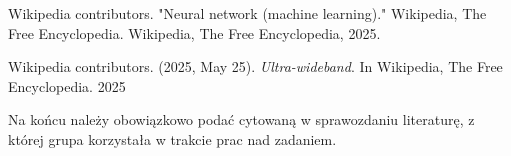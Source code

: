 \documentclass{classrep}
\begin{document}
\begin{thebibliography}{0}
	 Wikipedia contributors. "Neural network (machine learning)."
	Wikipedia, The Free Encyclopedia. Wikipedia, The Free Encyclopedia,
	2025.

	 Wikipedia contributors. (2025, May 25). \textit{Ultra-wideband}.
	In Wikipedia, The Free Encyclopedia. 2025

\end{thebibliography}

{\color{blue}
Na końcu należy obowiązkowo podać cytowaną w sprawozdaniu literaturę, z której
grupa korzystała w trakcie prac nad zadaniem.}
\end{document}
